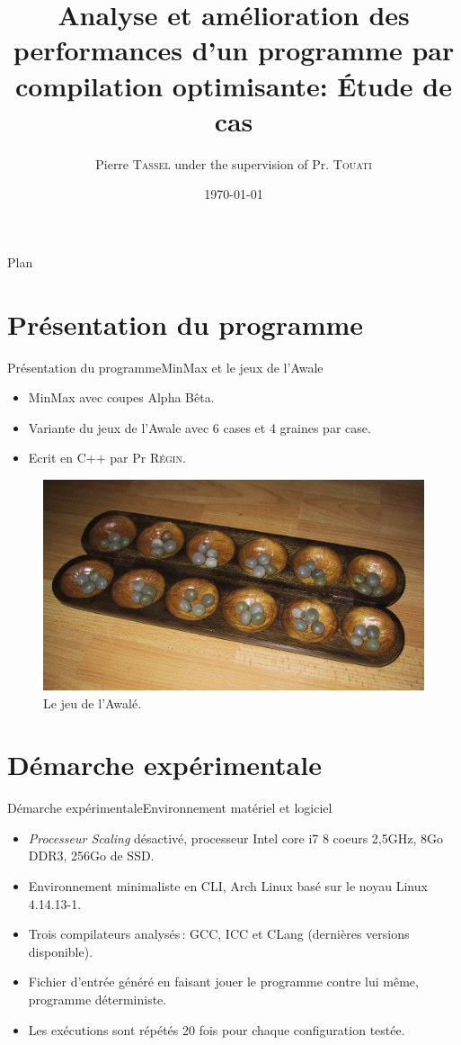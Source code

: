 \documentclass{beamer}
\title{Analyse et amélioration des performances d'un programme par compilation optimisante: Étude de cas}
\author[Pierre \textsc{Tassel}]{Pierre \textsc{Tassel} under the supervision of Pr. \textsc{Touati}}
\institute[Universitée Nice Sophia Antipolis] 
{Département of Computer Science\\
University of Nice Sophia-Antipolis
\and
Master Informatique}
\date{\today}
\begin{document}
\begin{frame}
  \titlepage
\end{frame}

\begin{frame}{Plan}
  \tableofcontents
\end{frame}

\section{Présentation du programme}

\begin{frame}{Présentation du programme}{MinMax et le jeux de l'Awale}
\begin{itemize}
  \item
    MinMax avec coupes Alpha Bêta.
  \item
    Variante du jeux de l'Awale avec 6 cases et 4 graines par case.
  \item
    Ecrit en C++ par Pr \textsc{Régin}.
  \end{itemize}
  \begin{figure}
   \includegraphics[width= 0.7\linewidth, keepaspectratio]{Awale.jpg}
   \caption{Le jeu de l'Awalé.\label{Fig:awale}}
\end{figure}
\end{frame}

\section{Démarche expérimentale}
\begin{frame}{Démarche expérimentale}{Environnement matériel et logiciel}
\begin{itemize}
  \item
  	\textit{Processeur Scaling} désactivé, processeur Intel core i7 8 coeurs 2,5GHz, 8Go DDR3, 256Go de SSD.
  \item
    Environnement minimaliste en CLI, Arch Linux basé sur le noyau Linux 4.14.13-1.
    \item
    Trois compilateurs analysés\,: GCC, ICC et CLang (dernières versions disponible).
    \item
    Fichier d'entrée généré en faisant jouer le programme contre lui même, programme déterministe.
    \item
    Les exécutions sont répétés 20 fois pour chaque configuration testée.
\end{itemize}
\end{frame}
\end{document}
